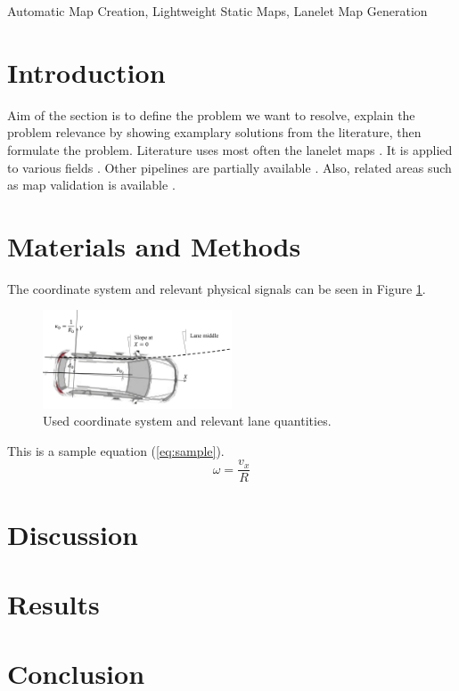 \documentclass[conference]{IEEEtran}
\begin{document}
\begin{IEEEkeywords}
Automatic Map Creation, Lightweight Static Maps, Lanelet Map Generation
\end{IEEEkeywords}

\section{Introduction} \label{sec:introduction}
Aim of the section is to define the problem we want to resolve, explain the problem relevance by showing examplary solutions from the literature, then formulate the problem.
Literature uses most often the lanelet maps \cite{LaneletBasic}. It is applied to various fields \cite{laneletApplication}. Other pipelines are partially available \cite{PythonLanelet}. Also, related areas
such as map validation is available \cite{laneletValidation}.

\section{Materials and Methods} \label{sec:matAndMeths}
The coordinate system and relevant physical signals can be seen in Figure \ref{fig:coordinateSystem}.
\begin{figure}[h]
    \centering
    \includegraphics[width=0.5\textwidth]{laneDataAndVehicle.png}
    \caption{Used coordinate system and relevant lane quantities.}
    \label{fig:coordinateSystem}
\end{figure}
This is a sample equation (\ref{eq:sample}).
\begin{equation} \label{eq:sample}
    \omega = \frac{v_x}{R}
\end{equation}

\section{Discussion} \label{sec:discussion}

\section{Results} \label{sec:results}

\section{Conclusion} \label{sec:conclusion}

 
\end{document}
